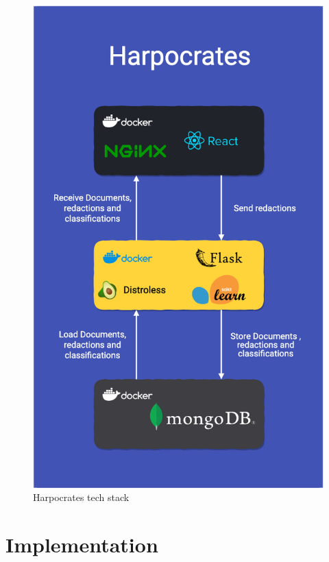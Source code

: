 \documentclass{l4proj}
\begin{document}
\begin{figure}
    \includegraphics[width=\linewidth]{figures/tech_stack.png}
    \caption{Harpocrates tech stack}
    \label{fig:lexical_plot}
\end{figure}

\chapter{Implementation}
\end{document}

